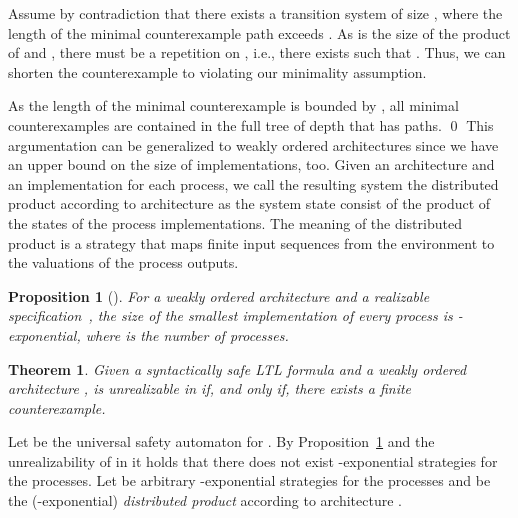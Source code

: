 \documentclass{LMCS}
\theoremstyle{plain}\newtheorem{theorem}[thm]{Theorem}
\theoremstyle{plain}\newtheorem{lemma}[thm]{Lemma}
\theoremstyle{plain}\newtheorem{proposition}[thm]{Proposition}
\theoremstyle{plain}\newtheorem{corollary}[thm]{Corollary}
\theoremstyle{definition}\newtheorem{definition}{Definition}[section]
\begin{document}
  Assume by contradiction that there exists a transition system  of size , where the length of the minimal counterexample path  exceeds .
  As  is the size of the product of  and , there must be a repetition on , i.e., there exists  such that .
  Thus, we can shorten the counterexample to  violating our minimality assumption.
  
  As the length of the minimal counterexample is bounded by , all minimal counterexamples are contained in the full tree of depth  that has  paths.
\qed\noindent
This argumentation can be generalized to weakly ordered architectures since we have an upper bound on the size of implementations, too.
Given an architecture  and an implementation for each process, we call the resulting system the distributed product according to architecture  as the system state consist of the product of the states of the process implementations.
The meaning of the distributed product is a strategy  that maps finite input sequences from the environment to the valuations of the process outputs.
\begin{proposition}[\hspace{-0.3pt}\cite{DBLP:conf/lics/FinkbeinerS05}] \label{thm:bound_distributed_realizability}
  For a weakly ordered  architecture and a realizable specification~, the size of the smallest implementation of every process is -exponential, where  is the number of processes.
\end{proposition}

\begin{theorem}
  Given a syntactically safe LTL formula  and a weakly ordered architecture ,  is unrealizable in  if, and only if, there exists a finite counterexample.
\end{theorem}
\proof
   Let  be the universal safety automaton for .
  By Proposition~\ref{thm:bound_distributed_realizability} and the unrealizability of  in  it holds that there does not exist -exponential strategies for the processes.
  Let  be arbitrary -exponential strategies for the  processes and  be the (-exponential) \emph{distributed product} according to architecture .
  
\end{document}
